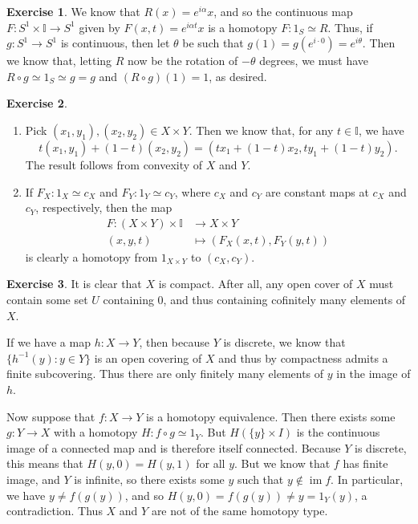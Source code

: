 \documentclass{article}
\theoremstyle{definition}
\newtheorem{intex}{Exercise}[section]
\newenvironment{exercise}{\begin{intex}\label{\theintex}}{\end{intex}}
\newcommand*\II{\mathbb I}
\DeclareMathOperator\im{im}
\begin{document}
\begin{exercise} \leavevmode
We know that $R(x)=e^{i\alpha}x$, and so the continuous map $F:S^1\times\II\to S^1$ given by $F(x,t)=e^{i\alpha t}x$ is a homotopy $F:1_S\simeq R$. Thus, if $g:S^1\to S^1$ is continuous, then let $\theta$ be such that $g(1)=g(e^{i\cdot0})=e^{i\theta}$. Then we know that, letting $R$ now be the rotation of $-\theta$ degrees, we must have $R\circ g\simeq 1_S\simeq g=g$ and $(R\circ g)(1)=1$, as desired. 
\end{exercise} 

\begin{exercise} \leavevmode
\begin{enumerate}
\item Pick $(x_1,y_1),(x_2,y_2)\in X\times Y$. Then we know that, for any $t\in\II$, we have \[t(x_1,y_1)+(1-t)(x_2,y_2)=(tx_1+(1-t)x_2,ty_1+(1-t)y_2).\] The result follows from convexity of $X$ and $Y$. 

\item If $F_X:1_X\simeq c_X$ and $F_Y:1_Y\simeq c_Y$, where $c_X$ and $c_Y$ are constant maps at $c_X$ and $c_Y$, respectively, then the map \begin{align*}F:(X\times Y)\times\II&\to X\times Y\\(x,y,t)&\mapsto(F_X(x,t),F_Y(y,t))\end{align*} is clearly a homotopy from $1_{X\times Y}$ to $(c_X,c_Y)$. 
\end{enumerate} 
\end{exercise} 

\begin{exercise} \leavevmode
It is clear that $X$ is compact. After all, any open cover of $X$ must contain some set $U$ containing 0, and thus containing cofinitely many elements of $X$. 

If we have a map $h:X\to Y$, then because $Y$ is discrete, we know that $\{h^{-1}(y):y\in Y\}$ is an open covering of $X$ and thus by compactness admits a finite subcovering. Thus there are only finitely many elements of $y$ in the image of $h$. 

Now suppose that $f:X\to Y$ is a homotopy equivalence. Then there exists some $g:Y\to X$ with a homotopy $H:f\circ g\simeq1_Y$. But $H(\{y\}\times I)$ is the continuous image of a connected map and is therefore itself connected. Because $Y$ is discrete, this means that $H(y,0)=H(y,1)$ for all $y$. But we know that $f$ has finite image, and $Y$ is infinite, so there exists some $y$ such that $y\not\in\im f$. In particular, we have $y\ne f(g(y))$, and so $H(y,0)=f(g(y))\ne y=1_Y(y)$, a contradiction. Thus $X$ and $Y$ are not of the same homotopy type. 
\end{exercise} 
\end{document}
